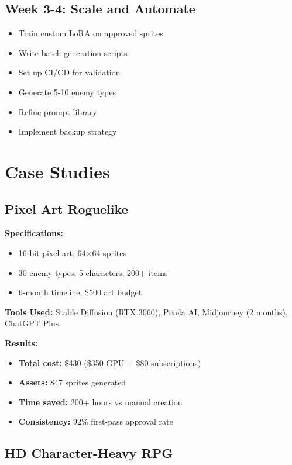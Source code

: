 \documentclass[11pt]{article}
\begin{document}
\subsection{Week 3-4: Scale and Automate}

\begin{itemize}[label=$\square$]
    \item Train custom LoRA on approved sprites
    \item Write batch generation scripts
    \item Set up CI/CD for validation
    \item Generate 5-10 enemy types
    \item Refine prompt library
    \item Implement backup strategy
\end{itemize}

\section{Case Studies}

\subsection{Pixel Art Roguelike}

\textbf{Specifications:}
\begin{itemize}
    \item 16-bit pixel art, 64×64 sprites
    \item 30 enemy types, 5 characters, 200+ items
    \item 6-month timeline, \$500 art budget
\end{itemize}

\textbf{Tools Used:} Stable Diffusion (RTX 3060), Pixela AI, Midjourney (2 months), ChatGPT Plus

\textbf{Results:}
\begin{itemize}
    \item \textbf{Total cost:} \$430 (\$350 GPU + \$80 subscriptions)
    \item \textbf{Assets:} 847 sprites generated
    \item \textbf{Time saved:} 200+ hours vs manual creation
    \item \textbf{Consistency:} 92\% first-pass approval rate
\end{itemize}

\subsection{HD Character-Heavy RPG}
\end{document}

